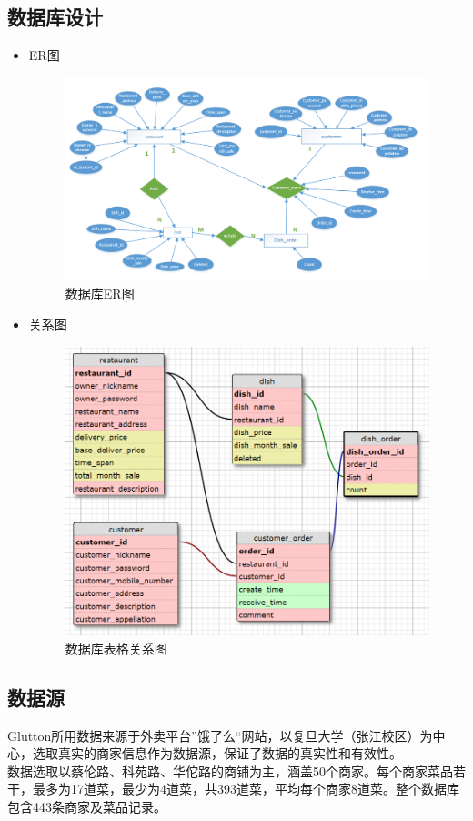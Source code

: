\documentclass[12pt, oneside,a4paper]{article}
\begin{document}
\subsection{数据库设计}
\begin{itemize}
 \item ER图
  \begin{figure}[H]
   \centering
     \includegraphics[width=6.50in]{ER.png}
     \caption{\small{数据库ER图}}
  \end{figure}

 \item 关系图
  \begin{figure}[H]
    \centering
     \includegraphics[width=6.5in]{tables.png}
     \caption{\small{数据库表格关系图}}
  \end{figure}
\end{itemize}
\subsection{数据源}
Glutton所用数据来源于外卖平台”饿了么“网站，以复旦大学（张江校区）为中心，选取真实的商家信息作为数据源，保证了数据的真实性和有效性。\\
数据选取以蔡伦路、科苑路、华佗路的商铺为主，涵盖50个商家。每个商家菜品若干，最多为17道菜，最少为4道菜，共393道菜，平均每个商家8道菜。整个数据库包含443条商家及菜品记录。
\end{document}
